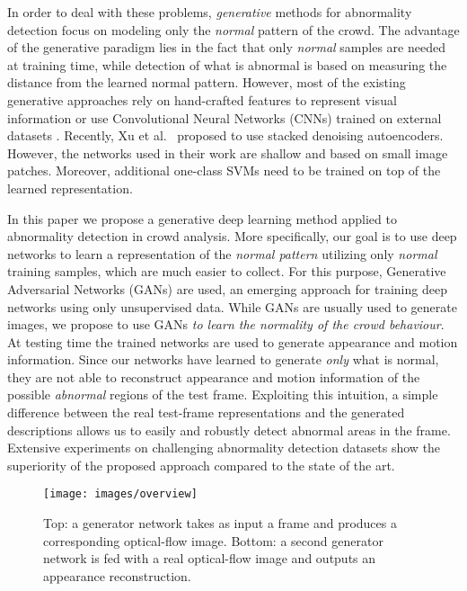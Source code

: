 \documentclass{article}
\begin{document}
In order to deal with these problems, {\em generative} methods for abnormality detection focus on modeling only the {\em normal} pattern of the crowd. The advantage of the generative paradigm lies in the fact that only {\em normal} samples are needed at training time, while detection of what is abnormal is based on measuring the distance from the learned normal pattern.
	However, most of the existing generative approaches rely on hand-crafted features to represent visual information \cite{mehran2009abnormal,mousavi2015analyzing,Mahadevan.anomaly.2010,cong2011sparse,kim2009observe} or use Convolutional Neural Networks (CNNs) trained on external datasets \cite{ravanbakhsh2016plug,sabokrouFFK16}. Recently, Xu et al.~\cite{xu2015learning} proposed to use stacked denoising autoencoders. However, the networks used in their work are shallow and based on small image patches. Moreover, additional one-class SVMs need to be trained on top of the learned representation.
	
	In this paper we propose a generative deep learning method applied to abnormality detection in crowd analysis. More specifically, our goal is to use deep networks to learn a representation of the {\em normal pattern} utilizing only {\em normal} training samples, which are much easier to collect. For this purpose, Generative Adversarial Networks (GANs) \cite{DBLP:conf/nips/GoodfellowPMXWOCB14} are used, an emerging approach for training deep networks using only unsupervised data. While GANs are usually used to generate images, we propose to use GANs {\em to learn the normality of the crowd behaviour}.
	At testing time the trained networks are used to generate appearance and motion information. Since our networks have learned to generate {\em only} what is normal, they are not able to reconstruct appearance and motion information of the possible {\em abnormal} regions of the test frame. Exploiting this intuition, a simple difference between the real test-frame representations and the generated descriptions allows us to easily and robustly detect abnormal areas in the frame.
	Extensive experiments on challenging abnormality detection datasets show the superiority of the proposed approach compared to the state of the art.


	
	\begin{figure}
	\centering
		\begin{minipage}{0.85\linewidth}
			
			\centerline{\texttt{[image: images/overview]}}
\end{minipage}
		\caption{{\small Top: a generator network takes as input a frame and produces a corresponding optical-flow image. Bottom: a second generator network is fed with a real optical-flow image and outputs an appearance reconstruction.}
		}
		\label{fig:overview}
\end{figure}
	
\end{document}
